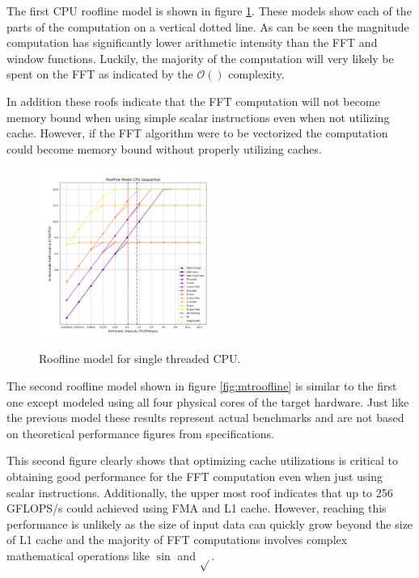 \documentclass[conference]{IEEEtran}
\begin{document}
The first CPU roofline model is shown in figure \ref{fig:sequantialroofline}.
These models show each of the parts of the computation on a vertical dotted
line. As can be seen the magnitude computation has significantly lower
arithmetic intensity than the FFT and window functions. Luckily, the majority
of the computation will very likely be spent on the FFT as indicated by the
$\mathcal{O}()$ complexity.

In addition these roofs indicate that the FFT computation will not become
memory bound when using simple scalar instructions even when not utilizing
cache. However, if the FFT algorithm were to be vectorized the computation
could become memory bound without properly utilizing caches.

\begin{center}
	\begin{figure}[H]
		\includegraphics[width=0.5\textwidth]{resources/images/roof-seq-cpu.png}
		\captionsetup{justification=centering}
		\caption{Roofline model for single threaded CPU.}
		\label{fig:sequantialroofline}
	\end{figure}
\end{center}

The second roofline model shown in figure \ref{fig:mtroofline} is similar to
the first one except modeled using all four physical cores of the target
hardware. Just like the previous model these results represent actual
benchmarks and are not based on theoretical performance figures from
specifications.

This second figure clearly shows that optimizing cache utilizations is critical
to obtaining good performance for the FFT computation even when just using
scalar instructions. Additionally, the upper most roof indicates that up to
256 GFLOPS/s could achieved using FMA and L1 cache. However, reaching this
performance is unlikely as the size of input data can quickly grow beyond the
size of L1 cache and the majority of FFT computations involves complex
mathematical operations like $\sin{}$ and $\sqrt{}$.
\end{document}
